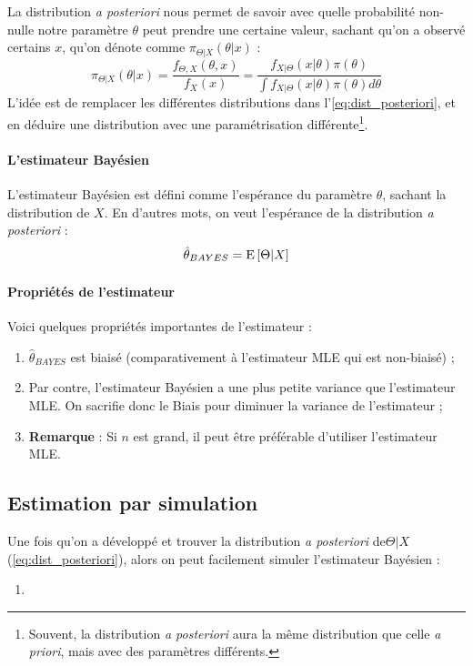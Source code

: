 \documentclass[12pt, french]{report}
\begin{document}
\begin{definition}
La distribution \emph{a posteriori} nous permet de savoir avec quelle probabilité non-nulle notre paramètre $\theta$ peut prendre une certaine valeur, sachant qu'on a observé certains $x$, qu'on dénote comme $\pi_{\Theta | X}(\theta | x)$ : 
\begin{equation}
\label{eq:dist_posteriori}
\pi_{\Theta | X}(\theta | x) = \frac{f_{\Theta, X}(\theta, x)}{f_{X}(x)} = \frac{f_{X|\Theta}(x | \theta) \pi(\theta)}{\int f_{X|\Theta}(x | \theta) \pi(\theta) d \theta} 
\end{equation}
L'idée est de remplacer les différentes distributions dans l'\autoref{eq:dist_posteriori}, et en déduire une distribution avec une paramétrisation différente\footnote{Souvent, la distribution \emph{a posteriori} aura la même distribution que celle \emph{a priori}, mais avec des paramètres différents.}.
\end{definition}

\paragraph{L'estimateur Bayésien} L'estimateur Bayésien est défini comme l'espérance du paramètre $\theta$, sachant la distribution de $X$. En d'autres mots, on veut l'espérance de la distribution \emph{a posteriori} : 
\begin{equation}
\label{eq:estimateur_bayes}
\hat{\theta}_{BAYES} = \mathrm{E} \left[ \Theta | X \right]
\end{equation}

\paragraph{Propriétés de l'estimateur} Voici quelques propriétés importantes de l'estimateur : 
\begin{enumerate}[label = \faAngleRight]
\item $\hat{\theta}_{BAYES}$ est biaisé (comparativement à l'estimateur MLE qui est non-biaisé) ;
\item Par contre, l'estimateur Bayésien a une plus petite variance que l'estimateur MLE. On sacrifie donc le Biais pour diminuer la variance de l'estimateur ;
\item \textbf{Remarque} : Si $n$ est grand,  il peut être préférable d'utiliser l'estimateur MLE.
\end{enumerate}

\subsection{Estimation par simulation}
Une fois qu'on a développé et trouver la distribution \emph{a posteriori} de$\Theta | X$ (\autoref{eq:dist_posteriori}), alors on peut facilement simuler l'estimateur Bayésien :
\begin{enumerate}
\item 
\end{enumerate}
\end{document}
